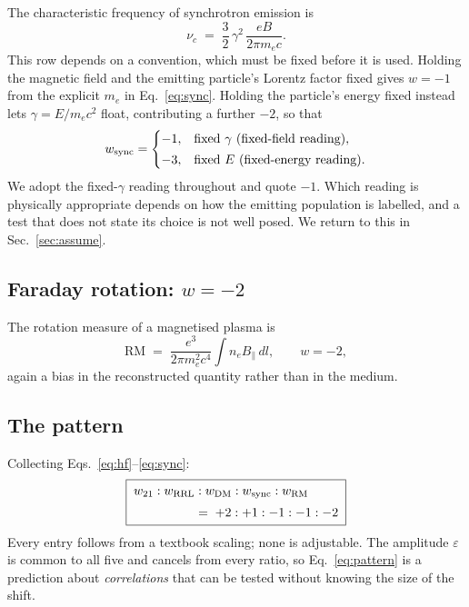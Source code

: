 \documentclass[aps,prd,twocolumn,superscriptaddress,nofootinbib,10pt]{revtex4-2}
\begin{document}
The characteristic frequency of synchrotron emission is~\cite{RybickiLightman1979}
%
\begin{equation}
  \nu_c \;=\; \frac{3}{2}\,\gamma^{2}\,\frac{eB}{2\pi m_e c}.
  \label{eq:sync}
\end{equation}
%
This row depends on a convention, which must be fixed before it is used. Holding the magnetic field
and the emitting particle's Lorentz factor fixed gives $w = -1$ from the explicit $m_e$ in
Eq.~\eqref{eq:sync}. Holding the particle's energy fixed instead lets $\gamma = E/m_e c^{2}$ float,
contributing a further $-2$, so that
%
\begin{equation}
  w_{\rm sync} = \begin{cases}
    -1, & \text{fixed } \gamma \text{ (fixed-field reading)},\\[2pt]
    -3, & \text{fixed } E \text{ (fixed-energy reading)}.
  \end{cases}
\end{equation}
%
We adopt the fixed-$\gamma$ reading throughout and quote $-1$. Which reading is physically
appropriate depends on how the emitting population is labelled, and a test that does not state its
choice is not well posed. We return to this in Sec.~\ref{sec:assume}.

\subsection{Faraday rotation: $w = -2$}

The rotation measure of a magnetised plasma is~\cite{BrentjensDeBruyn2005}
%
\begin{equation}
  \mathrm{RM} \;=\; \frac{e^{3}}{2\pi m_e^{2} c^{4}} \int n_e B_\parallel \, dl ,
  \qquad w = -2 ,
\end{equation}
%
again a bias in the reconstructed quantity rather than in the medium.

\subsection{The pattern}

Collecting Eqs.~\eqref{eq:hf}--\eqref{eq:sync}:
%
\begin{equation}
  \boxed{\;
  \begin{aligned}
    w_{21} : w_{\rm RRL} &: w_{\rm DM} : w_{\rm sync} : w_{\rm RM} \\[2pt]
    &=\; +2 : +1 : -1 : -1 : -2
  \end{aligned}
  \;}
  \label{eq:pattern}
\end{equation}
%
Every entry follows from a textbook scaling; none is adjustable. The amplitude $\varepsilon$ is
common to all five and cancels from every ratio, so Eq.~\eqref{eq:pattern} is a prediction about
\emph{correlations} that can be tested without knowing the size of the shift.
\end{document}
